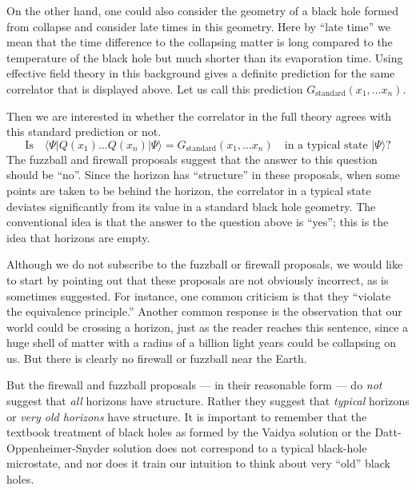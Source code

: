 \documentclass[12pt]{article}
\def\qop{Q}
\newcommand{\be}{\begin{equation}}
\newcommand{\ee}{\end{equation}}
\begin{document}
On the other hand, one could also consider the geometry of a black hole formed from collapse and consider late times in this geometry. Here by ``late time'' we  mean that the time difference to the collapsing matter is long  compared to the temperature of the black hole but much shorter than its evaporation time. Using effective field theory in this background gives a definite prediction for the same correlator that is displayed above.  Let us call this prediction $G_{\text{standard}}(x_1, \ldots x_n)$.  

Then we are interested in whether the correlator in the full theory agrees with this standard prediction or not.
\be
\label{structurequestion}
\text{Is}\quad \langle \Psi |  \qop(x_1) \ldots \qop(x_n) |\Psi \rangle = G_{\text{standard}}(x_1, \ldots x_n) \quad \text{in~a~typical~state~$|\Psi \rangle$?}
\ee
The fuzzball and firewall proposals suggest that the answer to this question should be ``no''. Since the horizon has ``structure'' in these proposals, when some points are taken to be behind the horizon, the correlator in a typical state deviates significantly from its value in a standard black hole geometry. The conventional idea is that the answer to the question above is ``yes''; this is the idea that horizons are empty.

Although we do not subscribe to the fuzzball or firewall proposals, we would like to start by pointing out that these proposals are not obviously incorrect, as is sometimes suggested.
For instance, one common criticism is that they ``violate the equivalence principle.'' Another common response is the  observation that our world could be crossing a horizon, just as the reader reaches this sentence,  since a huge shell of matter with a radius of a billion light years could be collapsing on us. But there is clearly no firewall or fuzzball near the Earth.

But the firewall and fuzzball proposals --- in their reasonable form ---  do {\em not} suggest that {\em all} horizons have structure. Rather they suggest that {\em typical} horizons or {\em very old horizons} have structure. It is important to remember that the textbook treatment of black holes as formed by the Vaidya solution \cite{vaidya1951gravitational}  or the Datt-Oppenheimer-Snyder solution \cite{datt1999class,oppenheimer1939continued} does not correspond to a typical black-hole microstate, and nor does it train our intuition to think about very ``old'' black holes.
\end{document}

